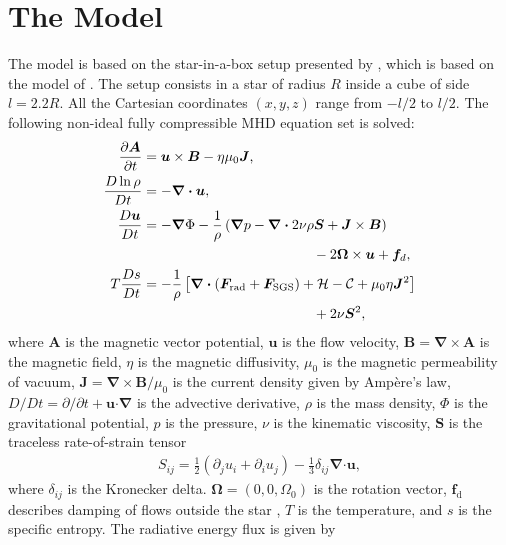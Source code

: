 \documentclass[baaa]{baaa}
\begin{document}
\section{The Model \label{model}}

The model is based on the star-in-a-box setup presented by \cite{Kapyla-2021}, which is based on the model of \cite{Dobler-2006}. The setup consists in a star of radius $R$ inside a cube of side $l=2.2R$. All the Cartesian coordinates $(x,y,z)$ range from $-l/2$ to $l/2$. The following non-ideal fully compressible MHD equation set is solved:
\begin{align}
    \frac{\partial \bm{A}}{\partial t} &= \bm{u} \times \bm{B} - \eta \mu_0 \bm{J}, \label{mhd_1} \\
    \frac{D \ln \rho}{D t} &= - \bm{\nabla} \bm{\cdot} \bm{u}, \label{mhd_2} \\
    \frac{D \bm{u}}{D t} &= - \bm{\nabla} \Phi - \frac{1}{\rho} \left( \bm{\nabla} p - \bm{\nabla} \bm{\cdot} 2 \nu \rho \bm{S} + \bm{J} \times \bm{B} \right) \nonumber \\
    &\hspace{4.3cm} - 2 \bm{\Omega}\times \bm{u} + \bm{f}_d, \label{mhd_3} \\
    T \frac{Ds}{Dt} &= - \frac{1}{\rho} \left[ \bm{\nabla}\bm{\cdot} (\bm{F}_\text{rad} + \bm{F}_\text{SGS})  + \mathcal{H} - \mathcal{C} + \mu_0 \eta \bm{J}^2 \right] \nonumber \\
    &\hspace{4.3cm} + 2 \nu \bm{S}^2, \label{mhd_4}
\end{align}
where $\bm{A}$ is the magnetic vector potential, $\bm{u}$ is the flow velocity, $\bm{B} = \bm{\nabla} \times \bm{A}$ is the magnetic field, $\eta$ is the magnetic diffusivity, $\mu_0$ is the magnetic permeability of vacuum, $\bm{J} = \bm{\nabla} \times \bm{B}/\mu_0$ is the current density given by Ampère's law, $D/Dt = \partial/\partial t + \bm{u} \bm{\cdot}\bm{\nabla}$ is the advective derivative, $\rho$ is the mass density, $\Phi$ is the gravitational potential, $p$ is the pressure, $\nu$ is the kinematic viscosity, $\bm{S}$ is the traceless rate-of-strain tensor
\begin{align}
    S_{ij} = \frac{1}{2}(\partial_j u_i + \partial_i u_j) - \frac{1}{3}\delta_{ij} \bm{\nabla} \bm{\cdot} \bm{u},  \label{S-tensor}
\end{align}
where $\delta_{ij}$ is the Kronecker delta. $\bm{\Omega}=(0,0,\Omega_0)$ is the rotation vector, $\bm{f}_\mathrm{d}$ describes damping of flows outside the star \citep[see][for details]{Dobler-2006}, $T$ is the temperature, and $s$ is the specific entropy. The radiative energy flux is given by 
\end{document}

